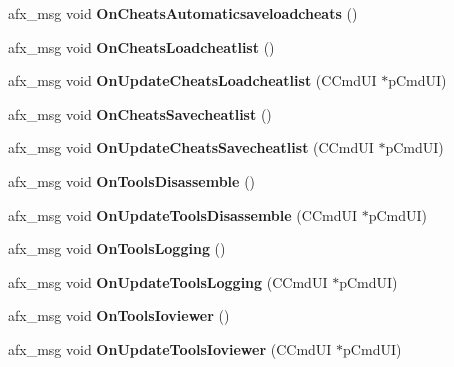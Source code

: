 \begin{DoxyCompactItemize}
afx\+\_\+msg void {\bfseries On\+Cheats\+Automaticsaveloadcheats} ()
\item 
\mbox{\label{class_main_wnd_a576e72b77e11a1e9f92b00279023b755}} 
afx\+\_\+msg void {\bfseries On\+Cheats\+Loadcheatlist} ()
\item 
\mbox{\label{class_main_wnd_a1afd028f12bc4f140adbf5cd052b62f4}} 
afx\+\_\+msg void {\bfseries On\+Update\+Cheats\+Loadcheatlist} (C\+Cmd\+UI $\ast$p\+Cmd\+UI)
\item 
\mbox{\label{class_main_wnd_a460ab90b938c269df34be6d15777eb14}} 
afx\+\_\+msg void {\bfseries On\+Cheats\+Savecheatlist} ()
\item 
\mbox{\label{class_main_wnd_ae49480ad4a8f36b444eef64f77f65806}} 
afx\+\_\+msg void {\bfseries On\+Update\+Cheats\+Savecheatlist} (C\+Cmd\+UI $\ast$p\+Cmd\+UI)
\item 
\mbox{\label{class_main_wnd_a9344948fd01b5295707700e2ba4eaee4}} 
afx\+\_\+msg void {\bfseries On\+Tools\+Disassemble} ()
\item 
\mbox{\label{class_main_wnd_aea8ccf27ebeaa61f96f6818d4c4ead3a}} 
afx\+\_\+msg void {\bfseries On\+Update\+Tools\+Disassemble} (C\+Cmd\+UI $\ast$p\+Cmd\+UI)
\item 
\mbox{\label{class_main_wnd_a18b152a47c0ce3d299120f5b3631232b}} 
afx\+\_\+msg void {\bfseries On\+Tools\+Logging} ()
\item 
\mbox{\label{class_main_wnd_a304d0e3ec18ccd207ddaf1effc9019b0}} 
afx\+\_\+msg void {\bfseries On\+Update\+Tools\+Logging} (C\+Cmd\+UI $\ast$p\+Cmd\+UI)
\item 
\mbox{\label{class_main_wnd_a7c63493ab974ac97642c7ac683cdb6f1}} 
afx\+\_\+msg void {\bfseries On\+Tools\+Ioviewer} ()
\item 
\mbox{\label{class_main_wnd_a0ad22b86f8eac276ed6be53909f1400f}} 
afx\+\_\+msg void {\bfseries On\+Update\+Tools\+Ioviewer} (C\+Cmd\+UI $\ast$p\+Cmd\+UI)
\item 
\mbox{\label{class_main_wnd_ab80b793bf5f38350a4c213677583ad24}} 

\end{DoxyCompactItemize}
